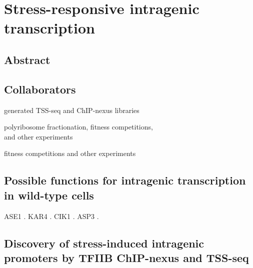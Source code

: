 \chapter{Stress-responsive intragenic transcription}
\label{chapter:stress}

\section{Abstract}

\lipsum[1]

\section{Collaborators}

\begin{description}[align=right, labelwidth=5cm, noitemsep, leftmargin=!]
    \item [Steve Doris] generated TSS-seq and ChIP-nexus libraries
    \item [Dan Spatt] polyribosome fractionation, fitness competitions,\\and other experiments
    \item [James Warner] fitness competitions and other experiments
\end{description}

\section{Possible functions for intragenic transcription in wild-type cells}

ASE1 \citep{mcknight2014}.
KAR4 \citep{gammie1999}.
CIK1 \citep{benanti2009}.
ASP3 \citep{huang2010}.

\clearpage

\section{Discovery of stress-induced intragenic promoters by TFIIB ChIP-nexus and TSS-seq}

